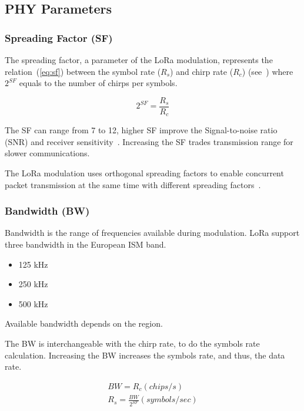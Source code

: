 \subsection{PHY Parameters}

\subsubsection{Spreading Factor (SF)}

The spreading factor, a parameter of the LoRa modulation, represents the
relation~(\ref{eq:sf}) between the symbol rate ($R_{s}$) and chirp rate ($R_{c}$)
(see~\cite{semtech:modemdesign}) where $2^{SF}$ equals to the number of chirps per
symbols.

\begin{equation}
 \label{eq:sf} 
  2^{SF} = \frac{R_s}{R_c}
\end{equation}

The SF can range from 7 to 12, higher SF improve the Signal-to-noise ratio
(SNR) and receiver sensitivity~\cite{semtech:modemdesign}.
Increasing the SF trades transmission range for slower communications.

The LoRa modulation uses orthogonal spreading factors to enable concurrent
packet transmission at the same time with different
spreading factors~\cite{semtech:modulationbasics}.

\subsubsection{Bandwidth (BW)}

Bandwidth is the range of frequencies available during modulation.
LoRa support three bandwidth in the European ISM band.

\begin{itemize}
    \item 125 kHz
    \item 250 kHz
    \item 500 kHz
\end{itemize}

Available bandwidth depends on the region. %

The BW is interchangeable with the chirp rate, to do the symbols rate
calculation.
Increasing the BW increases the symbols rate, and thus, the data rate.

\begin{gather}
 \label{eq:bw} 
  BW = R_c (chips/s) \\
  R_s = \frac{BW}{2^{SF}} (symbols / sec)
\end{gather}

